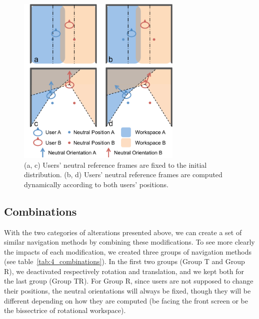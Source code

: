 \begin{figure}[htb]
  \centering
  \includegraphics[width=0.7\textwidth]{figures/ch4/neutral_ref}
  \caption{\label{fig:4_neutral_ref}(a, c) Users' neutral reference frames are fixed to the initial distribution. (b, d) Users' neutral reference frames are computed dynamically according to both users' positions.}
\end{figure}

\subsection{Combinations}
With the two categories of alterations presented above, we can create a set of similar navigation methods by combining these modifications. To see more clearly the impacts of each modification, we created three groups of navigation methods (see table~\ref{tab:4_combinations}). In the first two groups (Group T and Group R), we deactivated respectively rotation and translation, and we kept both for the last group (Group TR). For Group R, since users are not supposed to change their positions, the neutral orientations will always be fixed, though they will be different depending on how they are computed (be facing the front screen or be the bissectrice of rotational workspace).

